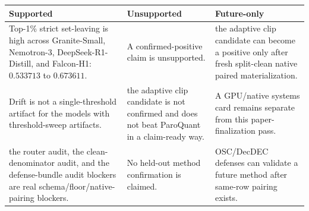 \documentclass{article}
\begin{document}
\begingroup\small
\begin{longtable}[]{@{}lll@{}}
\toprule
\begin{minipage}[b]{0.30\columnwidth}\raggedright
Supported\strut
\end{minipage} & \begin{minipage}[b]{0.30\columnwidth}\raggedright
Unsupported\strut
\end{minipage} & \begin{minipage}[b]{0.30\columnwidth}\raggedright
Future-only\strut
\end{minipage}\tabularnewline
\midrule
\endhead
\begin{minipage}[t]{0.30\columnwidth}\raggedright
Top-1\% strict set-leaving is high across Granite-Small, Nemotron-3,
DeepSeek-R1-Distill, and Falcon-H1: \(0.533713\) to
\(0.673611\).\strut
\end{minipage} & \begin{minipage}[t]{0.30\columnwidth}\raggedright
A confirmed-positive claim is unsupported.\strut
\end{minipage} & \begin{minipage}[t]{0.30\columnwidth}\raggedright
the adaptive clip candidate can become a positive only after fresh
split-clean native paired materialization.\strut
\end{minipage}\tabularnewline
\begin{minipage}[t]{0.30\columnwidth}\raggedright
Drift is not a single-threshold artifact for the models with
threshold-sweep artifacts.\strut
\end{minipage} & \begin{minipage}[t]{0.30\columnwidth}\raggedright
the adaptive clip candidate is not confirmed and does not beat ParoQuant
in a claim-ready way.\strut
\end{minipage} & \begin{minipage}[t]{0.30\columnwidth}\raggedright
A GPU/native systems card remains separate from this paper-finalization
pass.\strut
\end{minipage}\tabularnewline
\begin{minipage}[t]{0.30\columnwidth}\raggedright
the router audit, the clean-denominator audit, and the defense-bundle
audit blockers are real schema/floor/native-pairing blockers.\strut
\end{minipage} & \begin{minipage}[t]{0.30\columnwidth}\raggedright
No held-out method confirmation is claimed.\strut
\end{minipage} & \begin{minipage}[t]{0.30\columnwidth}\raggedright
OSC/DecDEC defenses can validate a future method after same-row pairing
exists.\strut
\end{minipage}\tabularnewline
\bottomrule
\end{longtable}
\endgroup
\end{document}
